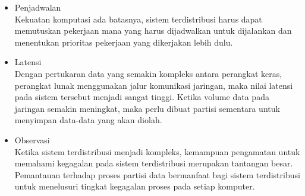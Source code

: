 \begin{itemize}
\item Penjadwalan\\
Kekuatan komputasi ada batasnya, sistem terdistribusi harus dapat memutuskan pekerjaan mana yang harus dijadwalkan untuk dijalankan dan menentukan prioritas pekerjaan yang dikerjakan lebih dulu. 
\item Latensi\\
Dengan pertukaran data yang semakin kompleks antara perangkat keras, perangkat lunak menggunakan jalur komunikasi jaringan, maka nilai latensi pada sistem tersebut menjadi sangat tinggi. Ketika volume data pada jaringan semakin meningkat, maka perlu dibuat partisi sementara untuk menyimpan data-data yang akan diolah. 
\item Observasi\\
Ketika sistem terdistribusi menjadi kompleks, kemampuan pengamatan untuk memahami kegagalan pada sistem terdistribusi merupakan tantangan besar. Pemantauan terhadap proses partisi data bermanfaat bagi sistem terdistribusi untuk menelusuri tingkat kegagalan proses pada setiap komputer. 
\end{itemize}

\newpage
